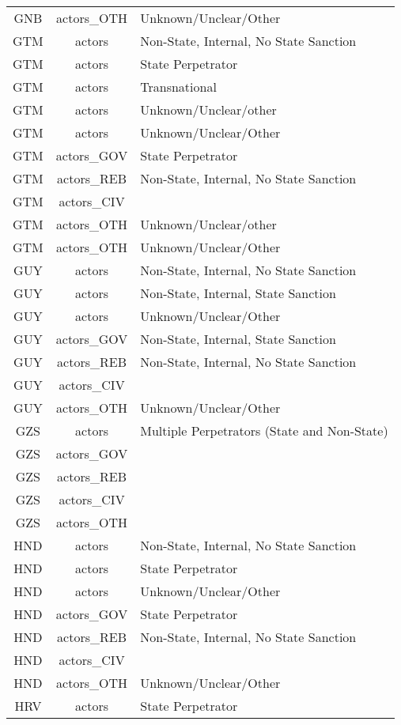 \documentclass[12pt]{article}
\begin{document}
\begin{center}
\begin{longtable}{|c|c|p{10cm}|}
  GNB & actors\_OTH & Unknown/Unclear/Other \\ 
  GTM & actors & Non-State, Internal, No State Sanction \\ 
  GTM & actors & State Perpetrator \\ 
  GTM & actors & Transnational \\ 
  GTM & actors & Unknown/Unclear/other \\ 
  GTM & actors & Unknown/Unclear/Other \\ 
  GTM & actors\_GOV & State Perpetrator \\ 
  GTM & actors\_REB & Non-State, Internal, No State Sanction \\ 
  GTM & actors\_CIV &  \\ 
  GTM & actors\_OTH & Unknown/Unclear/other \\ 
  GTM & actors\_OTH & Unknown/Unclear/Other \\ 
  GUY & actors & Non-State, Internal, No State Sanction \\ 
  GUY & actors & Non-State, Internal, State Sanction \\ 
  GUY & actors & Unknown/Unclear/Other \\ 
  GUY & actors\_GOV & Non-State, Internal, State Sanction \\ 
  GUY & actors\_REB & Non-State, Internal, No State Sanction \\ 
  GUY & actors\_CIV &  \\ 
  GUY & actors\_OTH & Unknown/Unclear/Other \\ 
  GZS & actors & Multiple Perpetrators (State and Non-State) \\ 
  GZS & actors\_GOV &  \\ 
  GZS & actors\_REB &  \\ 
  GZS & actors\_CIV &  \\ 
  GZS & actors\_OTH &  \\ 
  HND & actors & Non-State, Internal, No State Sanction \\ 
  HND & actors & State Perpetrator \\ 
  HND & actors & Unknown/Unclear/Other \\ 
  HND & actors\_GOV & State Perpetrator \\ 
  HND & actors\_REB & Non-State, Internal, No State Sanction \\ 
  HND & actors\_CIV &  \\ 
  HND & actors\_OTH & Unknown/Unclear/Other \\ 
  HRV & actors & State Perpetrator \\ 

\end{longtable}
\end{center}
\end{document}

